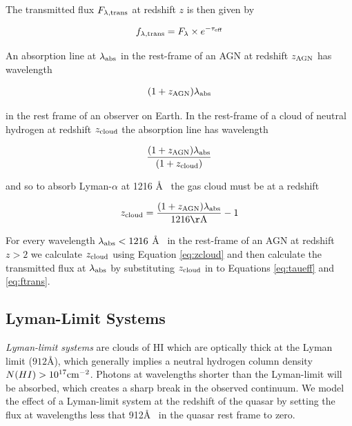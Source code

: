 The transmitted flux $F_{\lambda,{\rm trans}}$ at redshift $z$ is then given by 

\begin{eqnarray}
  \label{eq:ftrans}
  f_{\lambda,{\rm trans}} = F_\lambda \times e^{ -\tau_{\rm eff} }
\end{eqnarray}

An absorption line at $\lambda_{\rm abs}$ in the rest-frame of an AGN at redshift $z_{\rm AGN}$ has wavelength 

\begin{eqnarray}
  (1 + z_{\rm AGN})\lambda_{\rm abs} 
\end{eqnarray}

in the rest frame of an observer on Earth. 
In the rest-frame of a cloud of neutral hydrogen at redshift $z_{\rm cloud}$ the absorption line has wavelength 

\begin{eqnarray}
  \frac{ (1 + z_{\rm AGN}) \lambda_{\rm abs} } { (1 + z_{\rm cloud}) }
\end{eqnarray}

and so to absorb Lyman-$\alpha$ at 1216 \AA~ the gas cloud must be at a redshift

\begin{eqnarray}
  \label{eq:zcloud}
  z_{\rm cloud} = \frac{ (1 + z_{\rm AGN}) \lambda_{\rm abs} } { 1216{\rm \AA} } - 1
\end{eqnarray}

For every wavelength $\lambda_{\rm abs} < 1216$ \AA~ in the rest-frame of an AGN at redshift $z > 2$ we calculate $z_{\rm cloud}$ using Equation \ref{eq:zcloud} and then calculate the transmitted flux at $\lambda_{\rm abs}$ by substituting $z_{\rm cloud}$ in to Equations \ref{eq:taueff} and \ref{eq:ftrans}. 

\subsection{Lyman-Limit Systems}

{\it Lyman-limit systems} are clouds of HI which are optically thick at the Lyman limit ($912$\AA), which generally implies a neutral hydrogen column density $N(HI) > 10^{17} {\rm cm}^{-2}$. 
Photons at wavelengths shorter than the Lyman-limit will be absorbed, which creates a sharp break in the observed continuum. 
We model the effect of a Lyman-limit system at the redshift of the quasar by setting the flux at wavelengths less that 912\AA~ in the quasar rest frame to zero.   


